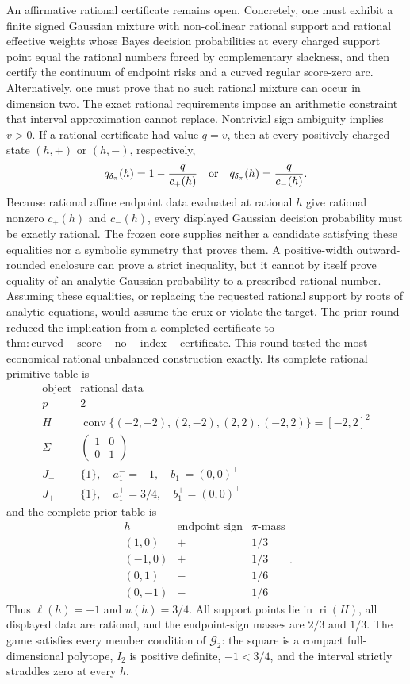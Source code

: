 An affirmative rational certificate remains open.  Concretely, one must exhibit a finite signed Gaussian mixture with non-collinear rational support and rational effective weights whose Bayes decision probabilities at every charged support point equal the rational numbers forced by complementary slackness, and then certify the continuum of endpoint risks and a curved regular score-zero arc.  Alternatively, one must prove that no such rational mixture can occur in dimension two.
The exact rational requirements impose an arithmetic constraint that interval approximation cannot replace.  Nontrivial sign ambiguity implies \(v>0\).  If a rational certificate had value \(q=v\), then at every positively charged state \((h,+)\) or \((h,-)\), respectively,
\[
 q_{\delta_\pi}(h)=1-\frac{q}{c_+(h)}
 \quad\hbox{or}\quad
 q_{\delta_\pi}(h)=\frac{q}{c_-(h)}.
\]
Because rational affine endpoint data evaluated at rational \(h\) give rational nonzero \(c_+(h)\) and \(c_-(h)\), every displayed Gaussian decision probability must be exactly rational.  The frozen core supplies neither a candidate satisfying these equalities nor a symbolic symmetry that proves them.  A positive-width outward-rounded enclosure can prove a strict inequality, but it cannot by itself prove equality of an analytic Gaussian probability to a prescribed rational number.  Assuming these equalities, or replacing the requested rational support by roots of analytic equations, would assume the crux or violate the target.
The prior round reduced the implication from a completed certificate to \(\mathrm{thm:curved-score-no-index-certificate}\).  This round tested the most economical rational unbalanced construction exactly.  Its complete rational primitive table is
\[
\begin{array}{c|l}
\text{object}&\text{rational data}\\ \hline
p&2\\
H&\operatorname{conv}\{(-2,-2),(2,-2),(2,2),(-2,2)\}=[-2,2]^2\\
\Sigma&\begin{pmatrix}1&0\\0&1\end{pmatrix}\\
J_-&\{1\},\quad a_1^-=-1,\quad b_1^-=(0,0)^\top\\
J_+&\{1\},\quad a_1^+=3/4,\quad b_1^+=(0,0)^\top
\end{array}
\]
and the complete prior table is
\[
\begin{array}{c|c|c}
h&\text{endpoint sign}&\pi\text{-mass}\\ \hline
(1,0)&+&1/3\\
(-1,0)&+&1/3\\
(0,1)&-&1/6\\
(0,-1)&-&1/6
\end{array}.
\]
Thus \(\ell(h)=-1\) and \(u(h)=3/4\).  All support points lie in \(\operatorname{ri}(H)\), all displayed data are rational, and the endpoint-sign masses are \(2/3\) and \(1/3\).  The game satisfies every member condition of \(\mathcal G_2\): the square is a compact full-dimensional polytope, \(I_2\) is positive definite, \(-1<3/4\), and the interval strictly straddles zero at every \(h\).

